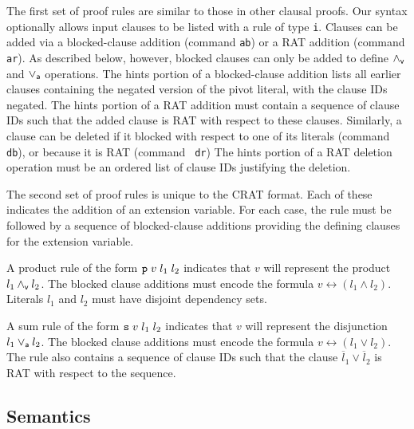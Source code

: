 \documentclass{llncs}
\newcommand{\pand}{\mathbin{\land_{\sf v}}}
\newcommand{\por}{\mathbin{\lor_{\sf a}}}
\newcommand{\obar}[1]{\overline{#1}}
\newcommand{\ite}{\mbox{\it ITE}}
\newcommand{\pite}{\mbox{\it ITE}_{\sf v}}
\begin{document}
The first set of proof rules are similar to those in other clausal
proofs.  Our syntax optionally allows input clauses to be listed with
a rule of type {\tt i}.  Clauses can be added via a blocked-clause addition (command {\tt ab})
or a RAT addition (command {\tt ar}).
As described below, however, blocked clauses can only be added
to define $\pand$ and $\por$
operations.  The hints portion
of a blocked-clause addition lists all earlier clauses containing the
negated version of the pivot literal, with the clause IDs negated.
The hints portion of a RAT addition must contain a sequence of clause
IDs such that the added clause is RAT with respect to these clauses.
Similarly, a clause can be deleted if it blocked with respect to one
of its literals (command {\tt db}), or because it is RAT (command {\tt
  dr}) The hints portion of a RAT deletion operation must be an
ordered list of clause IDs justifying the deletion.

The second set of proof rules is unique to the CRAT format.  Each of
these indicates the addition of an extension variable.  For each case,
the rule must be followed by a sequence of blocked-clause additions
providing the defining clauses for the extension variable.

A product rule of the form ${\tt p}\;v\;l_1\;l_2$ indicates that $v$
will represent the product $l_1 \pand l_2$.  The blocked clause
additions must encode the formula $v \leftrightarrow (l_1 \land l_2)$.
Literals $l_1$ and $l_2$ must have disjoint dependency sets.

A sum rule of the form ${\tt s}\;v\;l_1\;l_2$ indicates that $v$ will
represent the disjunction $l_1 \por l_2$.  The blocked clause
additions must encode the formula $v \leftrightarrow (l_1 \lor l_2)$.
The rule also contains a sequence of clause IDs such that the clause
$\obar{l}_1 \lor \obar{l}_2$ is RAT with respect to the sequence.


\subsection{Semantics}
\end{document}
